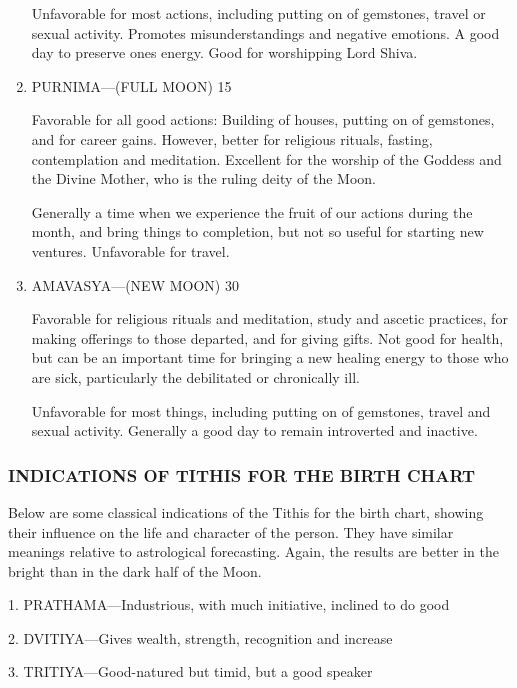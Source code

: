 \begin{enumerate}
Unfavorable for most actions, including putting on of gemstones, travel or sexual activity. Promotes misunderstandings and negative emotions. A good day to preserve ones energy. Good for worshipping Lord Shiva.

 

\item[ ] PURNIMA—(FULL MOON) 15

Favorable for all good actions: Building of houses, putting on of gemstones, and for career gains. However, better for religious rituals, fasting, contemplation and meditation. Excellent for the worship of the Goddess and the Divine Mother, who is the ruling deity of the Moon.

Generally a time when we experience the fruit of our actions during the month, and bring things to completion, but not so useful for starting new ventures. Unfavorable for travel.

 

\item[ ] AMAVASYA—(NEW MOON) 30   

Favorable for religious rituals and meditation, study and ascetic practices, for making offerings to those departed, and for giving gifts. Not good for health, but can be an important time for bringing a new healing energy to those who are sick, particularly the debilitated or chronically ill.

Unfavorable for most things, including putting on of gemstones, travel and sexual activity. Generally a good day to remain introverted and inactive.

 \end{enumerate}

\subsubsection{INDICATIONS OF TITHIS FOR THE BIRTH CHART}
 

Below are some classical indications of the Tithis for the birth chart, showing their influence on the life and character of the person. They have similar meanings relative to astrological forecasting. Again, the results are better in the bright than in the dark half of the Moon.

 

1.    PRATHAMA—Industrious, with much initiative, inclined to do good

2.    DVITIYA—Gives wealth, strength, recognition and increase

3.    TRITIYA—Good-natured but timid, but a good speaker

